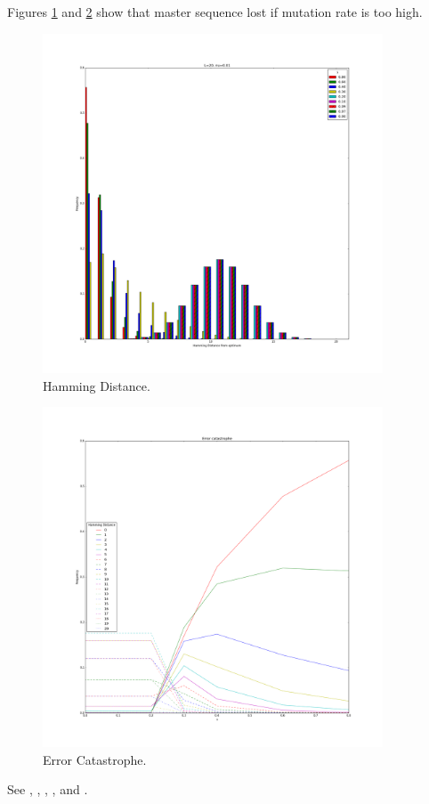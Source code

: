 \documentclass[]{article}
\begin{document}
Figures \ref{fig:ErrorCatastrophe1} and \ref{fig:ErrorCatastrophe2} show that master sequence lost if mutation rate is too high. 
\begin{figure}[H]
	\caption{Hamming Distance.}\label{fig:ErrorCatastrophe1} 
	\includegraphics[width=0.9\textwidth]{ErrorCatastrophe1}
\end{figure}
\begin{figure}[H]
	\caption{Error Catastrophe.}\label{fig:ErrorCatastrophe2} 
	\includegraphics[width=0.9\textwidth]{ErrorCatastrophe2}
\end{figure}


See \cite{eigen1978hypercycle}, \cite{eigen1988molecular}, \cite{eigen2002error}, \cite{crotty2001rna}, and \cite{stadtler2002fitness_landscapes}.



\printunsrtglossaries

 


\end{document}
